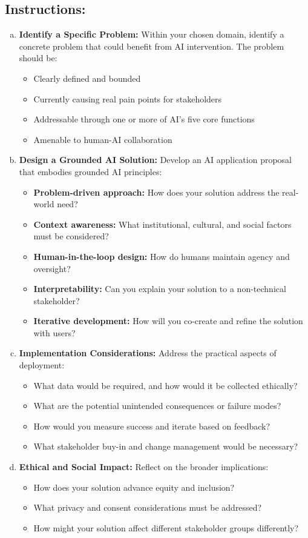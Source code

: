 \documentclass[11pt]{article}
\begin{document}
\subsection{Instructions:}
\begin{enumerate}[(a)]
\item \textbf{Identify a Specific Problem:} Within your chosen domain, identify a concrete problem that could benefit from AI intervention. The problem should be:
\begin{itemize}
\item Clearly defined and bounded
\item Currently causing real pain points for stakeholders
\item Addressable through one or more of AI's five core functions
\item Amenable to human-AI collaboration
\end{itemize}

\item \textbf{Design a Grounded AI Solution:} Develop an AI application proposal that embodies grounded AI principles:
\begin{itemize}
\item \textbf{Problem-driven approach:} How does your solution address the real-world need?
\item \textbf{Context awareness:} What institutional, cultural, and social factors must be considered?
\item \textbf{Human-in-the-loop design:} How do humans maintain agency and oversight?
\item \textbf{Interpretability:} Can you explain your solution to a non-technical stakeholder?
\item \textbf{Iterative development:} How will you co-create and refine the solution with users?
\end{itemize}

\item \textbf{Implementation Considerations:} Address the practical aspects of deployment:
\begin{itemize}
\item What data would be required, and how would it be collected ethically?
\item What are the potential unintended consequences or failure modes?
\item How would you measure success and iterate based on feedback?
\item What stakeholder buy-in and change management would be necessary?
\end{itemize}

\item \textbf{Ethical and Social Impact:} Reflect on the broader implications:
\begin{itemize}
\item How does your solution advance equity and inclusion?
\item What privacy and consent considerations must be addressed?
\item How might your solution affect different stakeholder groups differently?
\end{itemize}
\end{enumerate}
\end{document}
